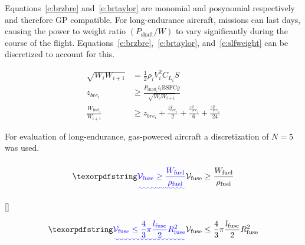     Equations~\eqref{e:brzbre} and~\eqref{e:brtaylor} are monomial and posynomial respectively and therefore GP compatible. For long-endurance aircraft, missions can last days, causing the power to weight ratio $(P_{\text{shaft}}/W)$ to vary significantly during the course of the flight.  
    Equations~\eqref{e:brzbre},~\eqref{e:brtaylor}, and~\eqref{e:slfweight} can be discretized to account for this.

\begin{align}
    \label{e:slfweightd}
    \sqrt{W_i W_{i+1}} &= \frac{1}{2} \rho_i V_i^2 C_{L_i} S \\
    \label{e:brzbred}
    z_{bre_i} &\geq \frac{P_{\text{shaft}_i}t_i \text{BSFC} g}{\sqrt{W_i W_{i+1}}}\\
    \label{e:brtaylord}
    \frac{W_{\text{fuel}_i}}{W_{i+1}} &\geq z_{bre_i} + \frac{z_{bre_i}^2}{2} + \frac{z_{bre_i}^3}{6} + \frac{z_{bre_i}^3}{24} 
    \end{align}

    For evaluation of long-endurance, gas-powered aircraft a discretization of $N=5$ was used. 

\DIFaddbegin \subsubsection{}



\begin{equation}
    \DIFadd{\label{e:fusevol}
    \mathcal{V}_{\text{fuse}} \geq \frac{W_\text{fuel}}{\rho_\text{fuel}}
}\end{equation}

[]

\begin{equation}
    \DIFadd{\label{e:fusevol2}
    \mathcal{V}_{\text{fuse}} \leq \frac{4}{3}\pi \frac{l_{\text{fuse}}}{2}R_{\text{fuse}}^2
}\end{equation}

